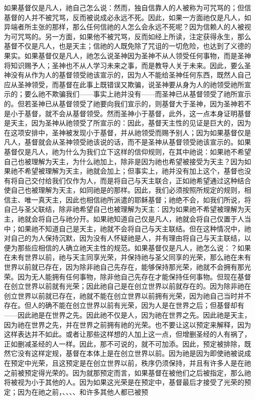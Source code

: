 如果基督仅是凡人，祂自己怎么说：然而，独自信靠人的人被称为可咒骂的；但信基督的人并不被咒骂，反而被说成必永远不死。因此，如果一方面祂仅是凡人，如异端者所主张的那样，那么任何信祂的人怎么会永远不死呢？因为信赖人的人被视为可咒骂的。另一方面，如果他不被咒骂，反而如经上所读，注定获得永生，那么基督不仅是凡人，也是天主；信祂的人既免除了咒诅的一切危险，也达到了义德的果实。如果基督仅是凡人，祂怎么说圣神因为圣神不从人领受任何事物，而是圣神将知识赐予人；圣神也不从人学习未来之事，而是教导人关于未来。因此，要么圣神没有从作为人的基督领受祂该宣示的，因为人不能给圣神任何东西，既然人自己应从圣神领受，而基督在此事上既错误又欺骗，说圣神要从身为人的祂领受祂所宣示的；要么祂不欺骗我们——事实上祂并没有——而圣神已从基督领受了祂所宣示的。但若圣神已从基督领受了祂要向我们宣示的，则基督大于圣神，因为圣神若不是小于基督，就不会从基督领受。然而圣神小于基督，此外，这一点本身证明基督是天主，因为圣神从祂领受了所宣示的：因此，基督天主性的见证是巨大的，因为在这项安排中，圣神被发现小于基督，并从祂领受而赐予别人；因为如果基督仅是凡人，基督就会从圣神领受祂该说的话，而不是圣神从基督领受祂该宣示的。如果基督仅是凡人，祂为什么为我们立下这样的信仰规则，在其中祂说：如果祂不希望自己也被理解为天主，为什么祂加上，除非是因为祂也希望被接受为天主？因为如果祂不希望被理解为天主，祂就会加上；但事实上，祂并没有加上这个，基督也没有将自己交付给我们仅作为人，而是将自己与天主联合，正如祂希望通过这种结合使自己也被理解为天主，如同祂是的那样。因此，我们必须按照所规定的规则，相信主、唯一真天主，因此也相信祂所派遣的耶稣基督；祂绝不会，如我们所说，将自己与圣父联结，除非祂希望自己也被理解为天主：因为如果祂不希望被理解为天主，祂就会将自己与祂分开。如果祂知道自己仅是凡人，祂就会将自己仅置于人当中；如果祂不知道自己是天主，祂就不会将自己与天主联结。但在这种情况中，祂对自己的为人保持沉默，因为没有人怀疑祂是人，并有理由将自己与天主联结，以便为那些应相信的人确立祂天主性的规范。如果基督仅是凡人，祂怎么说：？如果在未有世界以前，祂与天主同享光荣，并保持祂与圣父同享的光荣，那么祂在未有世界以前就已存在，因为除非祂自己先存在，能够保持那光荣，祂就不会拥有那光荣。因为无人能拥有任何事物，除非他自己先存在才能保持任何事物。但现在基督在创立世界以前就有光荣；因此祂自己是在创立世界以前就存在的。因为除非祂在创立世界以前就已存在，祂就不能在创立世界以前拥有光荣，因为祂自己当时并不存在。但人的确不能在创立世界以前有光荣，因为人是在世界之后；但基督却有——因此祂是在世界之先。因此祂不仅是人，因为祂在世界之先。因此祂是天主，因为祂在世界之先，并在世界之前拥有祂的光荣。也不要让这以预定来解释，因为这样表达并不如此。或者让那些这样想的人加上这一点，但增删圣经的人有祸了，正如删减圣经的人一样。因此，那不可说的，就不可加添。因此，预定被排除，既然它没有这样定规，基督在本体上是在创立世界以前。因为祂是因为即使祂被说成在预定中光荣，且这预定是在创立世界以前，秩序仍须保持，并且有许多人是在祂之前被预定得光荣的。因为就那预定而言，如果基督在被他们之后被指定，那么祂将被视为小于其他的人。因为如果这光荣是在预定中，基督最后才接受了光荣的预定；因为在祂之前，、、、、和许多其他人都已被预